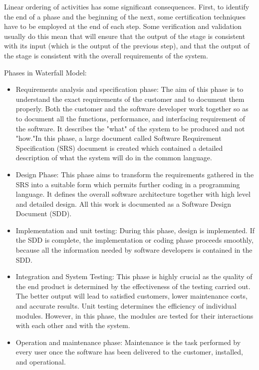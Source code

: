 \documentclass[oneside,a4paper,12pt]{report}
\begin{document}
Linear ordering of activities has some significant consequences. First, to identify the end of a phase and the beginning of the next, some certification techniques have to be employed at the end of each step. Some verification and validation usually do this mean that will ensure that the output of the stage is consistent with its input (which is the output of the previous step), and that the output of the stage is consistent with the overall requirements of the system.

Phases in Waterfall Model:
\begin{itemize}

  \item Requirements analysis and specification phase: The aim of this phase is to understand the exact requirements of the customer and to document them properly. Both the customer and the software developer work together so as to document all the functions, performance, and interfacing requirement of the software. It describes the "what" of the system to be produced and not "how."In this phase, a large document called Software Requirement Specification (SRS) document is created which contained a detailed description of what the system will do in the common language.
  
  \item Design Phase: This phase aims to transform the requirements gathered in the SRS into a suitable form which permits further coding in a programming language. It defines the overall software architecture together with high level and detailed design. All this work is documented as a Software Design Document (SDD).
  
  \item Implementation and unit testing: During this phase, design is implemented. If the SDD is complete, the implementation or coding phase proceeds smoothly, because all the information needed by software developers is contained in the SDD.
  
  \item Integration and System Testing: This phase is highly crucial as the quality of the end product is determined by the effectiveness of the testing carried out. The better output will lead to satisfied customers, lower maintenance costs, and accurate results. Unit testing determines the efficiency of individual modules. However, in this phase, the modules are tested for their interactions with each other and with the system.
  
  \item Operation and maintenance phase: Maintenance is the task performed by every user once the software has been delivered to the customer, installed, and operational.
\end{itemize}
        
\end{document}
